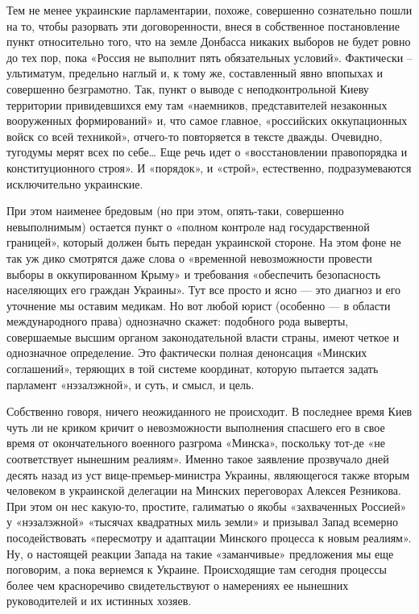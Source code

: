 \documentclass[a4paper,11pt]{extreport}
\begin{document}
Тем не менее украинские парламентарии, похоже, совершенно сознательно пошли на
то, чтобы разорвать эти договоренности, внеся в собственное постановление пункт
относительно того, что на земле Донбасса никаких выборов не будет ровно до тех
пор, пока «Россия не выполнит пять обязательных условий». Фактически –
ультиматум, предельно наглый и, к тому же, составленный явно впопыхах и
совершенно безграмотно. Так, пункт о выводе с неподконтрольной Киеву территории
привидевшихся ему там «наемников, представителей незаконных вооруженных
формирований» и, что самое главное, «российских оккупационных войск со всей
техникой», отчего-то повторяется в тексте дважды. Очевидно, тугодумы мерят всех
по себе… Еще речь идет о «восстановлении правопорядка и конституционного
строя». И «порядок», и «строй», естественно, подразумеваются исключительно
украинские.

При этом наименее бредовым (но при этом, опять-таки, совершенно невыполнимым) остается пункт о «полном контроле над государственной границей», который должен быть передан украинской стороне. На этом фоне не так уж дико смотрятся даже слова о «временной невозможности провести выборы в оккупированном Крыму» и требования «обеспечить безопасность населяющих его граждан Украины». Тут все просто и ясно --- это диагноз и его уточнение мы оставим медикам. Но вот любой юрист (особенно --- в области международного права) однозначно скажет: подобного рода выверты, совершаемые высшим органом законодательной власти страны, имеют четкое и однозначное определение. Это фактически полная денонсация «Минских соглашений», теряющих в той системе координат, которую пытается задать парламент «нэзалэжной», и суть, и смысл, и цель.

Собственно говоря, ничего неожиданного не происходит. В последнее время Киев чуть ли не криком кричит о невозможности выполнения спасшего его в свое время от окончательного военного разгрома «Минска», поскольку тот-де «не соответствует нынешним реалиям». Именно такое заявление прозвучало дней десять назад из уст вице-премьер-министра Украины, являющегося также вторым человеком в украинской делегации на Минских переговорах Алексея Резникова. При этом он нес какую-то, простите, галиматью о якобы «захваченных Россией» у «нэзалэжной» «тысячах квадратных миль земли» и призывал Запад всемерно посодействовать «пересмотру и адаптации Минского процесса к новым реалиям». Ну, о настоящей реакции Запада на такие «заманчивые» предложения мы еще поговорим, а пока вернемся к Украине. Происходящие там сегодня процессы более чем красноречиво свидетельствуют о намерениях ее нынешних руководителей и их истинных хозяев.
\end{document}
